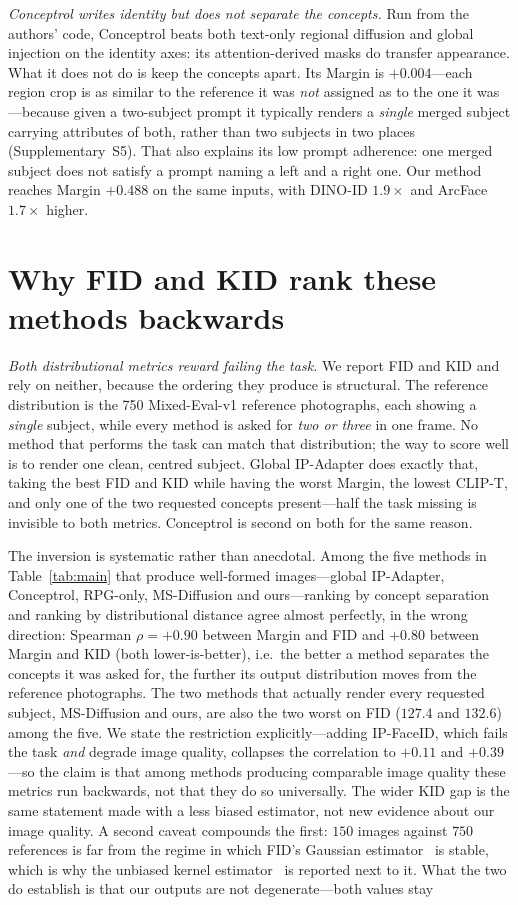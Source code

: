 \documentclass[review,10pt,times]{elsarticle}
\begin{document}
\noindent\textit{Conceptrol writes identity but does not separate the
concepts.}
Run from the authors' code, Conceptrol beats both text-only regional
diffusion and global injection on the identity axes: its attention-derived
masks do transfer appearance.  What it does not do is keep the concepts apart.
Its Margin is $+0.004$---each region crop is as similar to the reference it was
\emph{not} assigned as to the one it was---because given a two-subject prompt
it typically renders a \emph{single} merged subject carrying attributes of
both, rather than two subjects in two places (Supplementary~S5).  That also
explains its low prompt adherence: one merged subject does not satisfy a
prompt naming a left and a right one.  Our method reaches Margin $+0.488$ on
the same inputs, with DINO-ID $1.9\times$ and ArcFace $1.7\times$ higher.

\section{Why FID and KID rank these methods backwards}
\noindent\textit{Both distributional metrics reward failing the task.}
We report FID and KID and rely on neither, because the ordering they produce
is structural.  The reference distribution is the 750 Mixed-Eval-v1 reference
photographs, each showing a \emph{single} subject, while every method is asked
for \emph{two or three} in one frame.  No method that performs the task can
match that distribution; the way to score well is to render one clean, centred
subject.  Global IP-Adapter does exactly that, taking the best FID and KID
while having the worst Margin, the lowest CLIP-T, and only one of the two
requested concepts present---half the task missing is invisible to both
metrics.  Conceptrol is second on both for the same reason.

The inversion is systematic rather than anecdotal.  Among the five methods in
Table~\ref{tab:main} that produce well-formed images---global IP-Adapter,
Conceptrol, RPG-only, MS-Diffusion and ours---ranking by concept separation
and ranking by distributional distance agree almost perfectly, in the wrong
direction: Spearman $\rho=+0.90$ between Margin and FID and $+0.80$ between
Margin and KID (both lower-is-better), i.e.\ the better a method separates
the concepts it was asked for, the further its output distribution moves from
the reference photographs.  The two methods that actually render every
requested subject, MS-Diffusion and ours, are also the two worst on FID
($127.4$ and $132.6$) among the five.  We state the restriction
explicitly---adding IP-FaceID, which fails the task \emph{and}
degrade image quality, collapses the correlation to $+0.11$ and
$+0.39$---so the claim is that among methods producing comparable image
quality these metrics run backwards, not that they do so universally.
The wider KID gap is the same statement made with a less biased estimator,
not new evidence about our image quality.
A second caveat compounds the first: $150$ images against $750$ references is
far from the regime in which FID's Gaussian
estimator~\cite{heusel2017gans} is stable, which is why the unbiased kernel
estimator~\cite{binkowski2018demystifying} is reported next to it.  What the
two do establish is that our outputs are not degenerate---both values stay
\end{document}
